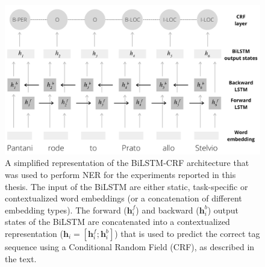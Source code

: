 \documentclass[12pt,a4paper,]{book}
\begin{document}
\begin{figure}

{\centering \includegraphics[width=1\linewidth]{images/bilstmcrf} 

}

\caption{A simplified representation of the BiLSTM-CRF architecture that was used to perform NER for the experiments reported in this thesis. The input of the BiLSTM are either static, task-specific or contextualized word embeddings (or a concatenation of different embedding types). The forward (\(\mathbf{h}_i^f\)) and backward (\(\mathbf{h}_i^b\)) output states of the BiLSTM are concatenated into a contextualized representation (\(\mathbf{h}_i = [\mathbf{h}_i^f; \mathbf{h}_i^b]\)) that is used to predict the correct tag sequence using a Conditional Random Field (CRF), as described in the text.}\label{fig:bilstmcrf}
\end{figure}
\end{document}
